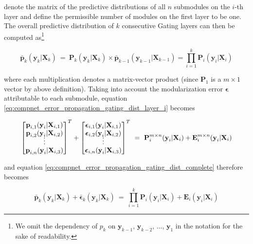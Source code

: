 denote the matrix of the predictive distributions of all $n$ submodules on the $i$-th layer and define the permissible number of modules on the first layer to be one. The overall predictive distribution of $k$ consecutive Gating layers can then be computed as\footnote{We omit the dependency of ${p}_k$ on $\textbf{y}_{k-1}$, $\textbf{y}_{k-2}$, ..., $\textbf{y}_1$ in the notation for the sake of readability.}

\begin{equation}
\label{eq:compnet_error_propagation_gating_dist_complete}
    \bar{\textbf{p}}_k(\textbf{y}_k|\textbf{X}_k)\ =\ \textbf{P}_k(\textbf{y}_k|\textbf{X}_k)\times\bar{\textbf{p}}_{k-1}(\textbf{y}_{k-1}|\textbf{X}_{k-1})=\prod_{i=1}^{k}\textbf{P}_i(\textbf{y}_i|\textbf{X}_i)
\end{equation}

where each multiplication denotes a matrix-vector product (since $\textbf{P}_1$ is a $m{\times}1$ vector by above definition). Taking into account the modularization error $\boldsymbol{\epsilon}$ attributable to each submodule, equation \ref{eq:compnet_error_propagation_gating_dist_layer_i} becomes

\begin{equation}
\label{eq:compnet_error_propagation_gating_dist_err_layer_i}
    \begin{bmatrix}
        \textbf{p}_{i,1}(\textbf{y}_i|\textbf{X}_{i,1})\\
        \textbf{p}_{i,2}(\textbf{y}_i|\textbf{X}_{i,2})\\
        \threevdots\\
        \textbf{p}_{i,n}(\textbf{y}_i|\textbf{X}_{i,3})
    \end{bmatrix}^T+%
    \begin{bmatrix}
        \boldsymbol{\epsilon}_{i,1}(\textbf{y}_i|\textbf{X}_{i,1})\\
        \boldsymbol{\epsilon}_{i,2}(\textbf{y}_i|\textbf{X}_{i,2})\\
        \threevdots\\
        \boldsymbol{\epsilon}_{i,n}(\textbf{y}_i|\textbf{X}_{i,3})
    \end{bmatrix}^T\ =\ %
    \textbf{P}_i^{m{\times}n}(\textbf{y}_i|\textbf{X}_i)+\textbf{E}_i^{m{\times}n}(\textbf{y}_i|\textbf{X}_i)
\end{equation}

and equation \ref{eq:compnet_error_propagation_gating_dist_complete} therefore becomes

\begin{equation}
\label{eq:compnet_error_propagation_gating_dist_err_complete}
    \bar{\textbf{p}}_k(\textbf{y}_k|\textbf{X}_k)+\bar{\boldsymbol{\epsilon}}_k(\textbf{y}_k|\textbf{X}_k)\ =\ \prod_{i=1}^{k}\textbf{P}_i(\textbf{y}_i|\textbf{X}_i)+\textbf{E}_i(\textbf{y}_i|\textbf{X}_i)
\end{equation}

